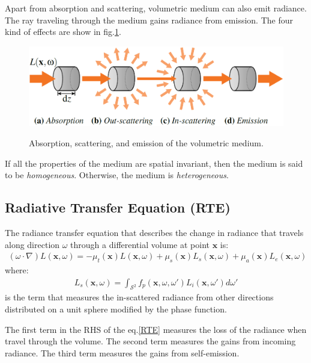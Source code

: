 \documentclass[acmtog]{acmart}
\begin{document}
Apart from absorption and scattering, volumetric medium can also emit radiance.
The ray traveling through the medium gains radiance from emission.
The four kind of effects are show in fig.\ref{radiative_transfer}.

\begin{figure}[htbp]
	\includegraphics[width=\linewidth]{figure/radiative transfer.png}
	\label{radiative_transfer}
	\caption{Absorption, scattering, and emission of the volumetric medium.}
\end{figure}

If all the properties of the medium are spatial invariant, then the medium is said to be \textit{homogeneous}.
Otherwise, the medium is \textit{heterogeneous}.


\subsection{Radiative Transfer Equation (RTE)}
The radiance transfer equation that describes the change in radiance that travels along direction $\omega$ through a differential volume at point $\mathbf x$ is:
\begin{equation}
	\begin{aligned}
	(\omega\cdot\nabla)L(\mathbf x, \omega)=-\mu_t(\mathbf x)L(\mathbf x, \omega)+\mu_s(\mathbf x)L_s(\mathbf x, \omega)+\mu_a(\mathbf x)L_e(\mathbf x, \omega)\label{RTE}
	\end{aligned}
\end{equation}
where:
\begin{equation}
	\begin{aligned}
	L_s(\mathbf x, \omega)=\int_{\mathcal S^2}f_p(\mathbf x, \omega, \omega')L_i(\mathbf x, \omega')d\omega'
	\end{aligned}
\end{equation}
is the term that measures the in-scattered radiance from other directions distributed on a unit sphere modified by the phase function.

The first term in the RHS of the eq.\eqref{RTE} measures the loss of the radiance when travel through the volume.
The second term measures the gains from incoming radiance.
The third term measures the gains from self-emission.
\end{document}
